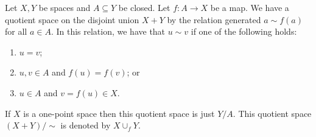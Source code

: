\documentclass[letterpaper, 11pt, oneside]{book}
\begin{document}
\begin{defn}[$X \cup_{f} Y$]
  Let $X, Y$ be spaces and $A \subseteq Y$ be closed.
  Let $f\colon A \to X$ be a map.
  We have a quotient space on the disjoint union $X + Y$ by the relation generated $a \sim f(a)$ for all $a \in A$.
  In this relation, we have that $u \sim v$ if one of the following holds:
  \begin{enumerate}
  \item $u = v$;
  \item $u, v \in A$ and $f(u) = f(v)$; or
  \item $u \in A$ and $v = f(u) \in X$.
  \end{enumerate}
  If $X$ is a one-point space then this quotient space is just $Y / A$.
  This quotient space $(X + Y) / \sim$ is denoted by $X \cup_{f} Y$.
\end{defn}

\clearpage
\end{document}
